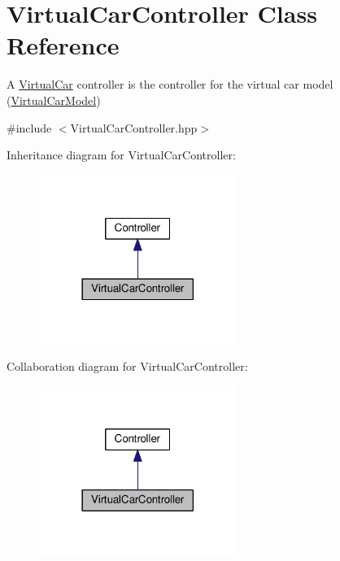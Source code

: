 \hypertarget{classVirtualCarController}{}\section{Virtual\+Car\+Controller Class Reference}
\label{classVirtualCarController}


A \hyperlink{classVirtualCar}{Virtual\+Car} controller is the controller for the virtual car model (\hyperlink{classVirtualCarModel}{Virtual\+Car\+Model})  




{\ttfamily \#include $<$Virtual\+Car\+Controller.\+hpp$>$}



Inheritance diagram for Virtual\+Car\+Controller\+:\nopagebreak
\begin{figure}[H]
\begin{center}
\leavevmode
\includegraphics[width=182pt]{classVirtualCarController__inherit__graph}
\end{center}
\end{figure}


Collaboration diagram for Virtual\+Car\+Controller\+:\nopagebreak
\begin{figure}[H]
\begin{center}
\leavevmode
\includegraphics[width=182pt]{classVirtualCarController__coll__graph}
\end{center}
\end{figure}
